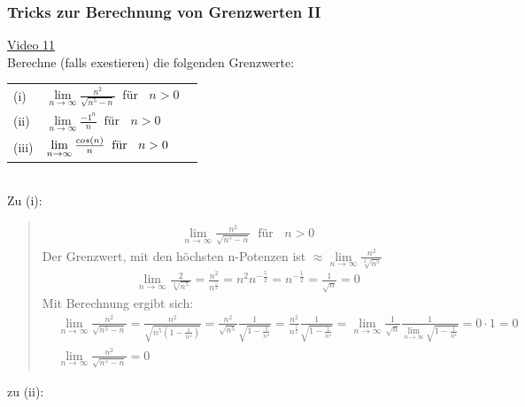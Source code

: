 \subsubsection{Tricks zur Berechnung von Grenzwerten II}
\href{https://youtu.be/3wf0Q-vtFGo}{Video 11}\\
Berechne (falls exestieren) die folgenden Grenzwerte:\\
\begin{tabular}[t]{lll}%
	(i) & $\lim\limits_ {n\to\infty}\frac{n^2}{\sqrt{n^5-n}} \;\;\text{für }\;\; n>0   $ \vspace*{2mm} \\
	(ii) & $\lim\limits_ {n\to\infty}\frac{-1^n}{n}\;\;\text{für }\;\; n>0  $\vspace*{2mm}  \\	
	(iii)&$\lim\limits_ {n\to\infty}\frac{cos(n)}{n}\;\;\text{für }\;\; n>0  \vspace*{4mm}$
\end{tabular} \\
Zu (i):\\
\begin{quote}
	\begin{align*}
	\lim\limits_ {n\to\infty}\frac{n^2}{\sqrt{n^5-n}} \;\;\text{für }\;\; n>0 
	\end{align*}
	Der Grenzwert, mit den höchsten n-Potenzen ist $ \approx \lim\limits_ {n\to\infty}\frac{n^2}{\sqrt[2]{n^5}}$ \\
	\begin{align*}
	\lim\limits_ {n\to\infty}\frac{2}{\sqrt[2]{n^5}}=\frac{n^2}{n^{\frac{5}{2}}}=n^2 n^{-\frac{5}{2}}=n^{-\frac{1}{2}}=\frac{1}{\sqrt{n}}=0
	\end{align*}
	Mit Berechnung ergibt sich:\\
	\begin{align*}
	&\lim\limits_ {n\to\infty}\frac{n^2}{\sqrt{n^5-n}} =\frac{n^2}{\sqrt{n^5(1-\frac{1}{n^4})}}=\frac{n^2}{\sqrt{n^5}}\frac{1}{\sqrt{1-\frac{1}{n^4}}}=\frac{n^2}{n^{\frac{5}{2}}}
	\frac{1}{\sqrt{1-\frac{1}{n^4}}}=\lim\limits_ {n\to\infty}\frac{1}{\sqrt{n}}\frac{1}{\lim\limits_ {n\to\infty}\sqrt{1-\frac{1}{n^4}}}=0\cdot 1=0\\
	&\lim\limits_ {n\to\infty}\frac{n^2}{\sqrt{n^5-n}}=0
	\end{align*}
\end{quote}
zu (ii):\\
